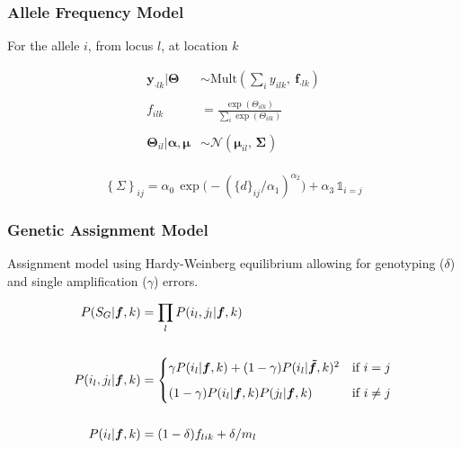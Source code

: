 \documentclass[t]{beamer}\usepackage[]{graphicx}\usepackage[]{color}
\begin{document}

\begin{frame}
\frametitle{Allele Frequency Model}

For the allele $i$, from locus $l$, at location $k$

\begin{align*}
\bm{y}_{\cdot l k}|\bm{\Theta} &\sim \text{Mult}\left(\textstyle\sum_i y_{ilk},\: \bm{f}_{\cdot l k}\right) \\
\\
f_{ilk} &= \frac{\exp(\Theta_{ilk})}{\sum_i \exp(\Theta_{ilk})} \\
\\
\bm{\Theta}_{il}|\bm{\alpha},\bm{\mu} &\sim \mathcal{N}( \bm{\mu}_{il},\, \bm{\Sigma_{}}) \\
\end{align*}

\[ \left\{\Sigma\right\}_{ij} = \alpha_0 \, \exp \Big(-(\{d\}_{ij}/\alpha_1)^{\alpha_2} \Big) + \alpha_3 \, \mathds{1}_{i=j} \]

\end{frame}




\begin{frame}
\frametitle{Genetic Assignment  Model}

Assignment model using Hardy-Weinberg equilibrium allowing for genotyping ($\delta$) and single amplification ($\gamma$) errors.

\begin{align*}
P(S_G|\bm{f},k) &= \prod_l P(i_l, j_l | \bm{f},k) \\
\\
P(i_l, j_l | \bm{f},k) &= 
\begin{cases}
\gamma P(i_l|\bm{f},k) + (1-\gamma)P(i_l|\bm{\tilde f},k)^2 & \text{if $i=j$} \vspace{2mm} \\
(1-\gamma) P(i_l|\bm{f},k) P(j_l|\bm{f},k)      & \text{if $i \ne j$}
\end{cases} \\
\\
P(i_l|\bm{f},k) &= (1-\delta) f_{lik} + \delta / m_l
\end{align*}

\end{frame}

\end{document}
